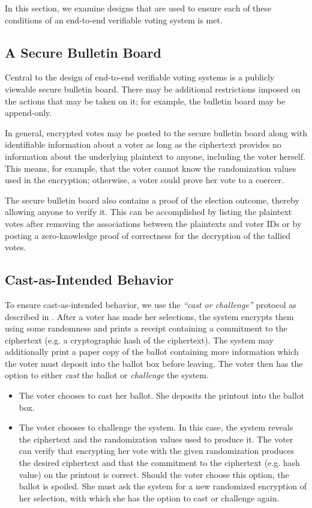 In this section, we examine designs that are used to ensure each of these conditions of an end-to-end verifiable voting system is met.

\subsection{A Secure Bulletin Board} \label{evote:design:sbb}

Central to the design of end-to-end verifiable voting systems is a publicly viewable secure bulletin board. There may be additional restrictions imposed on the actions that may be taken on it; for example, the bulletin board may be append-only.

In general, encrypted votes may be posted to the secure bulletin board along with identifiable information about a voter as long as the ciphertext provides no information about the underlying plaintext to anyone, including the voter herself. This means, for example, that the voter cannot know the randomization values used in the encryption; otherwise, a voter could prove her vote to a coercer.

The secure bulletin board also contains a proof of the election outcome, thereby allowing anyone to verify it. This can be accomplished by listing the plaintext votes after removing the associations between the plaintexts and voter IDs or by posting a zero-knowledge proof of correctness for the decryption of the tallied votes.

\subsection{Cast-as-Intended Behavior} \label{evote:design:castasintended}

To ensure cast-as-intended behavior, we use the \emph{``cast or challenge''} protocol as described in \cite{neff04, benaloh06}. After a voter has made her selections, the system encrypts them using some randomness and prints a receipt containing a commitment to the ciphertext (e.g. a cryptographic hash of the ciphertext). The system may additionally print a paper copy of the ballot containing more information which the voter must deposit into the ballot box before leaving. The voter then has the option to either \emph{cast} the ballot or \emph{challenge} the system.
\begin{itemize}
\item The voter chooses to cast her ballot. She deposits the printout into the ballot box.
\item The voter chooses to challenge the system. In this case, the system reveals the ciphertext and the randomization values used to produce it. The voter can verify that encrypting her vote with the given randomization produces the desired ciphertext and that the commitment to the ciphertext (e.g. hash value) on the printout is correct. Should the voter choose this option, the ballot is spoiled. She must ask the system for a new randomized encryption of her selection, with which she has the option to cast or challenge again.
\end{itemize}

